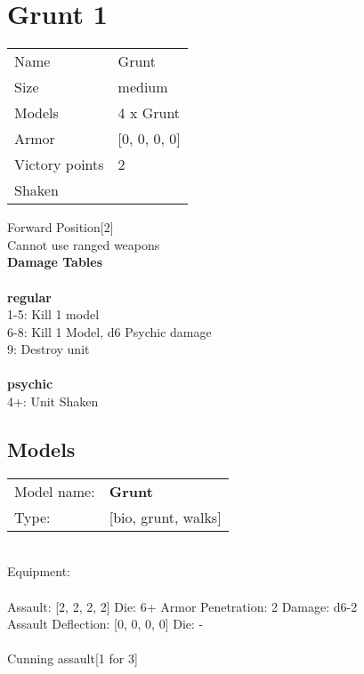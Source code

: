 \clearpage

\section{ Grunt 1 }

\begin{tabular}{ll}
  Name & Grunt \\
  Size & medium\\
  Models & 4 x Grunt\\
  Armor & [0, 0, 0, 0]\\
  Victory points & 2\\
  Shaken & \\
\end{tabular}

Forward Position[2]\\ 
Cannot use ranged weapons\\ 



{\bf Damage Tables} \\
\ \\ {\bf regular } \\
1-5: Kill 1 model \\
6-8: Kill 1 Model, d6 Psychic damage \\
9: Destroy unit \\
\ \\ {\bf psychic } \\
4+: Unit Shaken \\


\clearpage

\subsection{ Models }

\begin{tabular}{ll}
Model name: & {\bf Grunt } \\
Type: & [bio, grunt, walks] \\
\end{tabular}
\ \\
Equipment:  \\
\ \\
Assault: [2, 2, 2, 2] Die: 6+ Armor Penetration: 2 Damage: d6-2 \\
Assault Deflection: [0, 0, 0, 0] Die: -\\
\\ 
Cunning assault[1 for 3]\\ 
 
\ \\

\ \\
 
\ \\














